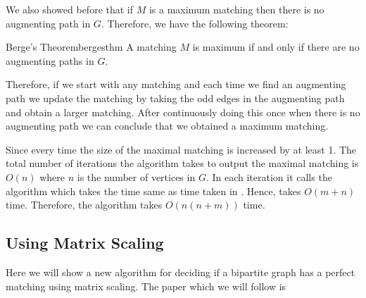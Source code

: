 We also showed before that if $M$ is a maximum matching then there is no augmenting path in $G$. Therefore, we have the following theorem:
\begin{Theorem}{Berge's Theorem}{bergesthm}
	A matching $M$ is maximum if and only if there are no augmenting paths in $G$.
\end{Theorem}

Therefore, if we start with any matching and each time we find an augmenting path we update the matching by taking the odd edges in the augmenting path and obtain a larger matching. After continuously doing this once when there is no augmenting path we can conclude that we obtained a maximum matching.

\begin{algorithm}
	\caption{$(G)$}
	\DontPrintSemicolon
\end{algorithm}
Since every time the size of the maximal matching is increased by at least 1. The total number of iterations the algorithm takes to output the maximal matching is $O(n)$ where $n$ is the number of vertices in $G$.  In each iteration it calls the  algorithm which takes the time same as time taken in . Hence,  takes $O(m+n)$ time. Therefore, the  algorithm takes $O(n(n+m))$ time.

\subsection{Using Matrix Scaling}
Here we will show a new algorithm for deciding if a bipartite graph has a perfect matching using matrix scaling. The paper which we will follow is  \cite{LinialSamorodnitskyWigderson_1998_Ads_CONF}

\begin{algoprob}
\end{algoprob}

